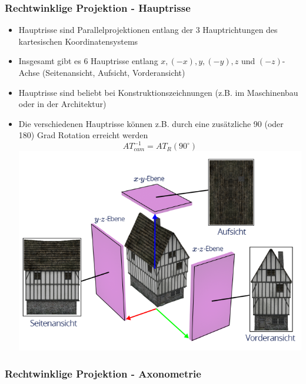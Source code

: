 \documentclass{scrartcl}
\begin{document}
\subsubsection{Rechtwinklige Projektion - Hauptrisse}

\begin{itemize}
	\item Hauptrisse sind Parallelprojektionen entlang der 3 Hauptrichtungen des kartesischen Koordinatensystems
	\item Insgesamt gibt es 6 Hauptrisse entlang $x, (-x), y, (-y), z$ und $(-z)$-Achse (Seitenansicht, Aufsicht, Vorderansicht)
	\item Hauptrisse sind beliebt bei Konstruktionszeichnungen (z.B. im Maschinenbau oder in der Architektur)
	\item Die verschiedenen Hauptrisse können z.B. durch eine zusätzliche 90 (oder 180) Grad Rotation erreicht werden
	\begin{equation}
		AT_{cam}^{-1} = AT_R(90^\circ)
	\end{equation}
	\includegraphics[scale=0.5]{figures/house_ortho.png}
\end{itemize}

\subsubsection{Rechtwinklige Projektion - Axonometrie}
\end{document}
